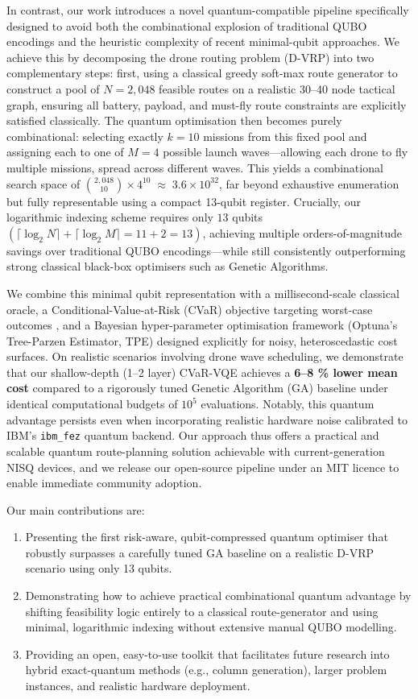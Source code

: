 In contrast, our work introduces a novel quantum-compatible pipeline specifically designed to avoid both the combinational explosion of traditional QUBO encodings and the heuristic complexity of recent minimal-qubit approaches. We achieve this by decomposing the drone routing problem (D-VRP) into two complementary steps: first, using a classical greedy soft-max route generator to construct a pool of $N=2,048$ feasible routes on a realistic 30–40 node tactical graph, ensuring all battery, payload, and must-fly route constraints are explicitly satisfied classically. The quantum optimisation then becomes purely combinational:
selecting exactly \(k = 10\) missions from this fixed pool and assigning
each to one of \(M = 4\) possible launch waves—allowing each drone to fly
multiple missions, spread across different waves.
This yields a combinational search space of 
${2,048 \choose 10} \times 4^{10} \;\approx\; 3.6 \times 10^{32}$,
far beyond exhaustive enumeration but fully representable using a
compact 13-qubit register.
Crucially, our logarithmic indexing scheme requires only
\(13\) qubits
\((\lceil\log_2 N\rceil + \lceil\log_2 M\rceil = 11 + 2 = 13)\),
achieving multiple orders-of-magnitude savings over traditional QUBO
encodings—while still consistently outperforming strong classical
black-box optimisers such as Genetic Algorithms.


We combine this minimal qubit representation with a millisecond-scale classical oracle, a Conditional-Value-at-Risk (CVaR)\cite{barkoutsos_improving_2020} objective targeting worst-case outcomes , and a Bayesian hyper-parameter optimisation framework (Optuna's Tree-Parzen Estimator, TPE) designed explicitly for noisy, heteroscedastic cost surfaces. On realistic scenarios involving drone wave scheduling, we demonstrate that our shallow-depth (1–2 layer) CVaR-VQE achieves a \textbf{6–8 \% lower mean cost} compared to a rigorously tuned Genetic Algorithm (GA) baseline under identical computational budgets of $10^5$ evaluations. Notably, this quantum advantage persists even when incorporating realistic hardware noise calibrated to IBM's \texttt{ibm\_fez} quantum backend. Our approach thus offers a practical and scalable quantum route-planning solution achievable with current-generation NISQ devices, and we release our open-source pipeline under an MIT licence to enable immediate community adoption.

Our main contributions are:
\begin{enumerate}
\item Presenting the first risk-aware, qubit-compressed quantum optimiser that robustly surpasses a carefully tuned GA baseline on a realistic D-VRP scenario using only 13 qubits.
\item Demonstrating how to achieve practical combinational quantum advantage by shifting feasibility logic entirely to a classical route-generator and using minimal, logarithmic indexing without extensive manual QUBO modelling.
\item Providing an open, easy-to-use toolkit that facilitates future research into hybrid exact-quantum methods (e.g., column generation), larger problem instances, and realistic hardware deployment.
\end{enumerate}

